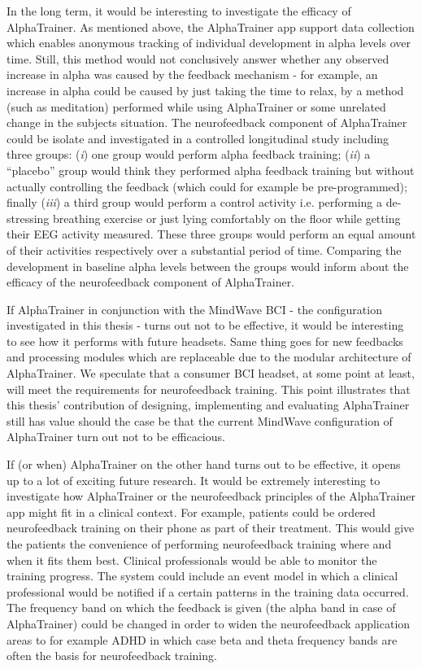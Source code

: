\documentclass[a4paper,10pt,english,lof,lot,twoside]{puthesis}
\begin{document}
In the long term, it would be interesting to investigate the efficacy of AlphaTrainer. As mentioned above, the AlphaTrainer app support data collection which enables anonymous tracking of individual development in alpha levels over time. Still, this method would not conclusively answer whether any observed increase in alpha was caused by the feedback mechanism - for example, an increase in alpha could be caused by just taking the time to relax, by a method (such as meditation) performed while using AlphaTrainer or some unrelated change in the subjects situation. The neurofeedback component of AlphaTrainer could be isolate and investigated in a controlled longitudinal study including three groups: (\emph{i}) one group would perform alpha feedback training; (\emph{ii}) a ``placebo'' group would think they performed alpha feedback training but without actually controlling the feedback (which could for example be pre-programmed); finally (\emph{iii}) a third group would perform a control activity i.e. performing a de-stressing breathing exercise or just lying comfortably on the floor while getting their EEG activity measured. These three groups would perform an equal amount of their activities respectively over a substantial period of time. Comparing the development in baseline alpha levels between the groups would inform about the efficacy of the neurofeedback component of AlphaTrainer.

If AlphaTrainer in conjunction with the MindWave BCI - the configuration investigated in this thesis - turns out not to be effective, it would be interesting to see how it performs with future headsets. Same thing goes for new feedbacks and processing modules which are replaceable due to the modular architecture of AlphaTrainer. We speculate that a consumer BCI headset, at some point at least, will meet the requirements for neurofeedback training. This point illustrates that this thesis' contribution of designing, implementing and evaluating AlphaTrainer still has value should the case be that the current MindWave configuration of AlphaTrainer turn out not to be efficacious.

If (or when) AlphaTrainer on the other hand turns out to be effective, it opens up to a lot of exciting future research. It would be extremely interesting to investigate how AlphaTrainer or the neurofeedback principles of the AlphaTrainer app might fit in a clinical context. For example, patients could be ordered neurofeedback training on their phone as part of their treatment. This would give the patients the convenience of performing neurofeedback training where and when it fits them best. Clinical professionals would be able to monitor the training progress. The system could include an event model in which a clinical professional would be notified if a certain patterns in the training data occurred. The frequency band on which the feedback is given (the alpha band in case of AlphaTrainer) could be changed in order to widen the neurofeedback application areas to for example ADHD in which case beta and theta frequency bands are often the basis for neurofeedback training.
\end{document}
